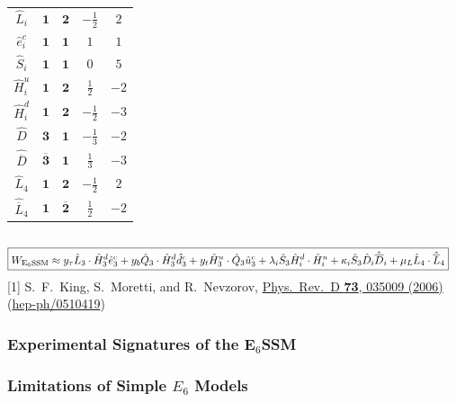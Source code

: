 \documentclass[10pt,aspectratio=169]{beamer}
\begin{document}
\begin{frame}
\begin{columns}[t]
\begin{column}{0.5\textwidth}
\begin{table}[h]
\begin{tabular}{ccccc}
            $\hat{L}_i$ & $\mathbf{1}$ & $\mathbf{2}$ & $-\frac{1}{2}$ & $2$ \\
            $\hat{e}_i^c$ & $\mathbf{1}$ & $\mathbf{1}$ & $1$ & $1$ \\
            $\hat{S}_i$ & $\mathbf{1}$ & $\mathbf{1}$ & $0$ & $5$ \\
            $\hat{H}_i^u$ & $\mathbf{1}$ & $\mathbf{2}$ & $\frac{1}{2}$
            & $-2$ \\
            $\hat{H}_i^d$ & $\mathbf{1}$ & $\mathbf{2}$ & $-\frac{1}{2}$
            & $-3$ \\
            $\hat{D}$ & $\mathbf{3}$ & $\mathbf{1}$ & $-\frac{1}{3}$ & $-2$ \\
            $\hat{\overline{D}}$ & $\mathbf{\overline{3}}$ &  $\mathbf{1}$
            & $\frac{1}{3}$ & $-3$ \\
            $\hat{L}_4$ & $\mathbf{1}$ & $\mathbf{2}$ & $-\frac{1}{2}$ & $2$ \\
            $\hat{\overline{L}}_4$ & $\mathbf{1}$ & $\mathbf{\overline{2}}$
            & $\frac{1}{2}$ & $-2$ \\
            \bottomrule
          \end{tabular}
        \end{table}
      \end{column}
    \end{columns}
    \vspace{-4pt}
    \begin{align*}
      \Aboxed{W_{\text{E}_6\text{SSM}} \approx y_{\tau} \hat{L}_3 \cdot
        \hat{H}^d_3 \hat{e}^c_3 + y_b \hat{Q}_3 \cdot \hat{H}^d_3 \hat{d}_3^c
        + y_t \hat{H}^u_3 \cdot \hat{Q}_3 \hat{u}_3^c + \lambda_i \hat{S}_3
        \hat{H}_i^d \cdot \hat{H}_i^u  + \kappa_i \hat{S}_3 \hat{D}_i
        \hat{\overline{D}}_i + \mu_L \hat{L}_4 \cdot \hat{\overline{L}}_4}
    \end{align*}
        {\tiny [1] S.~F.~King, S.~Moretti, and R.~Nevzorov,
          \href{http://dx.doi.org/10.1103/PhysRevD.73.035009}{Phys.~Rev.~D
            \textbf{73}, 035009 (2006)}
          (\href{http://arxiv.org/abs/hep-ph/0510419}{hep-ph/0510419})}
\end{frame}

\begin{frame}
  \frametitle{Experimental Signatures of the E$_6$SSM}
\end{frame}

\begin{frame}
  \frametitle{Limitations of Simple $E_6$ Models}
\end{frame}
\end{document}
